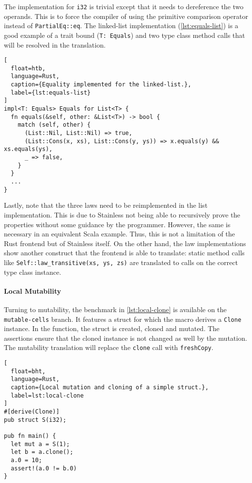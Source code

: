 The implementation for \lstinline!i32! is trivial except that it needs to
dereference the two operands. This is to force the compiler of using the
primitive comparison operator instead of  \lstinline!PartialEq::eq!. The
linked-list implementation (\autoref{lst:equals-list}) is a good example of a
trait bound (\lstinline!T: Equals!) and two type class method calls that will be
resolved in the translation.

\begin{lstlisting}[
  float=htb,
  language=Rust,
  caption={Equality implemented for the linked-list.},
  label={lst:equals-list}
]
impl<T: Equals> Equals for List<T> {
  fn equals(&self, other: &List<T>) -> bool {
    match (self, other) {
      (List::Nil, List::Nil) => true,
      (List::Cons(x, xs), List::Cons(y, ys)) => x.equals(y) && xs.equals(ys),
      _ => false,
    }
  }
  ...
}
\end{lstlisting}

Lastly, note that the three laws need to be reimplemented in the list
implementation. This is due to Stainless not being able to recursively prove the
properties without some guidance by the programmer. However, the same is
necessary in an equivalent Scala example. Thus, this is not a limitation of the
Rust frontend but of Stainless itself. On the other hand, the law
implementations show another construct that the frontend is able to translate:
static method calls like \lstinline!Self::law_transitive(xs, ys, zs)! are
translated to calls on the correct type class instance.

\paragraph{Local Mutability}

Turning to mutability, the benchmark in \autoref{lst:local-clone} is available
on the \texttt{mutable-cells} branch. It features a struct for which the macro
derives a \lstinline!Clone! instance. In the function, the struct is created,
cloned and mutated. The assertions ensure that the cloned instance is not
changed as well by the mutation. The mutability translation  will replace the
\lstinline!clone! call with \lstinline!freshCopy!.

\begin{lstlisting}[
  float=bht,
  language=Rust,
  caption={Local mutation and cloning of a simple struct.},
  label=lst:local-clone
]
#[derive(Clone)]
pub struct S(i32);

pub fn main() {
  let mut a = S(1);
  let b = a.clone();
  a.0 = 10;
  assert!(a.0 != b.0)
}
\end{lstlisting}


